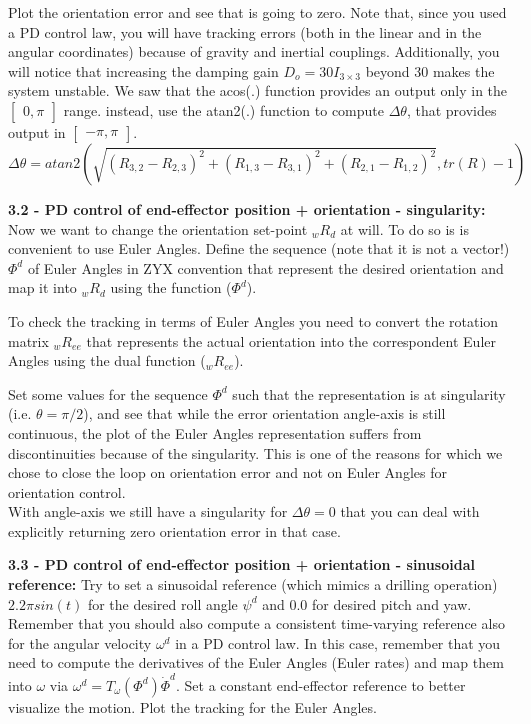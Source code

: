 \documentclass[11pt]{article}
\newcommand{\mat}[1]{\ensuremath{\begin{bmatrix}#1\end{bmatrix}}}	%
\begin{document}
Plot   the  orientation error and see that is going to zero.
 Note that, since you used a PD control law,  you will have tracking errors (both in the linear and in the angular  coordinates) because of gravity and inertial couplings. Additionally, you will notice that increasing the damping gain  $D_o = 30I_{3\times3}$ beyond 30 makes the system unstable.
We saw that the acos(.) function provides an output only in the $\mat{ 0 , \pi}$ range. 
instead, use the atan2(.) function to compute  $\Delta \theta$, that provides output in $\mat{ -\pi   , \pi }$.\\

\begin{equation}
\Delta \theta = atan2\left(\sqrt{(R_{3,2} - R_{2,3})^2 + (R_{1,3} - R_{3,1})^2 + (R_{2,1} - R_{1,2})^2}, tr(R) -1\right)
\end{equation}






\textbf{3.2 - PD control of end-effector position + orientation - singularity:}
Now we want to change the orientation set-point  ${}_wR_{d}$ at will. To do so 
is is convenient to use Euler Angles. Define the sequence (note that it is not a vector!)  
$\Phi^d$ of Euler Angles in ZYX convention that represent the desired orientation 
and map it into ${}_wR_{d}$ using the function  ($\Phi^d$). 

To check the tracking in terms of Euler Angles you need to convert the rotation matrix ${}_wR_{ee}$ 
that represents the actual orientation  into the correspondent Euler Angles using the dual function (${}_wR_{ee}$).

Set some values for the sequence $\Phi^d$ such that the representation is at singularity (i.e. $\theta = \pi/2$), 
and see that while the error orientation angle-axis is still continuous, the 
plot of the Euler Angles representation suffers from discontinuities because of the singularity. 
This is one of the reasons for which we chose to close the loop on orientation error and not on Euler Angles for orientation control. \\
With angle-axis we still have a singularity for $\Delta \theta = 0$ that you can deal with explicitly returning zero orientation error in that case.



 

\textbf{3.3 - PD control of end-effector position + orientation - sinusoidal reference:}
Try to set a sinusoidal reference (which mimics a drilling operation)  $ 2.2 \pi sin(t)$ for the desired roll angle $\psi^d$ and 0.0 for desired pitch and yaw. Remember that you should also compute a consistent time-varying reference also for the angular velocity $\omega^{d}$ in a PD control law. In this case, remember that you need to compute the derivatives of the Euler Angles (Euler rates) and map  them into $\omega$ via  $\omega^d = T_{\omega}(\Phi^d)\dot{\Phi}^d$. Set a constant end-effector reference to better visualize the motion.
Plot the tracking for the Euler Angles.\\
\end{document}
